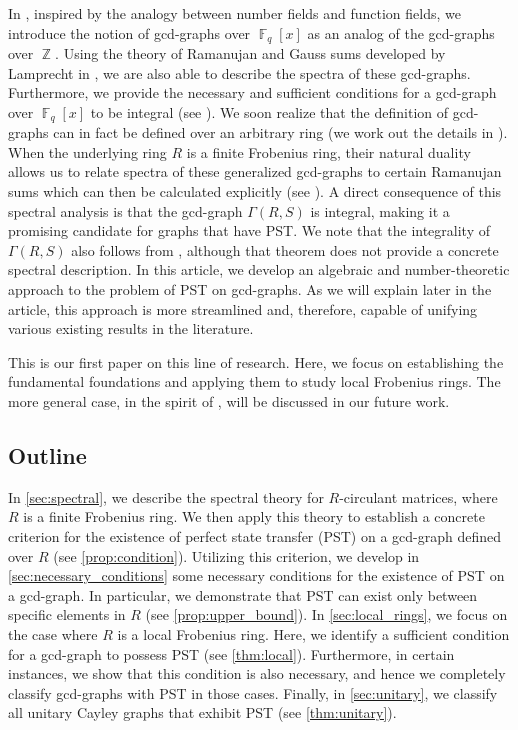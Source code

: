 \documentclass[12pt, a4paper]{amsart}
\theoremstyle{definition}
\DeclareMathOperator{\Z}{\mathbb{Z}}
\DeclareMathOperator{\F}{\mathbb{F}}
\numberwithin{equation}{section}
\begin{document}
In \cite{minavc2024gcd}, inspired by the analogy between number fields and function fields, we introduce the notion of gcd-graphs over $\F_q[x]$ as an analog of the gcd-graphs over $\Z$. Using the theory of Ramanujan and Gauss sums developed by Lamprecht in \cite{lamprecht1953allgemeine}, we are also able to describe the spectra of these gcd-graphs. Furthermore, we provide the necessary and sufficient conditions for a gcd-graph over $\F_q[x]$ to be integral (see \cite{nguyen2024integral}). We soon realize that the definition of gcd-graphs can in fact be defined over an arbitrary ring (we work out the details in \cite{nguyen2025gcd}). When the underlying ring $R$ is a finite Frobenius ring, their natural duality allows us to relate spectra of these generalized gcd-graphs to certain Ramanujan sums which can then be calculated explicitly (see \cite[Theorem 4.16]{nguyen2025gcd}). A direct consequence of this spectral analysis is that the gcd-graph $\Gamma(R,S)$ is integral, making it a promising candidate for graphs that have PST. We note that the integrality of $\Gamma(R,S)$ also follows from \cite[Theorem 1.1]{nguyen2024integral}, although that theorem does not provide a concrete spectral description. In this article, we develop an algebraic and number-theoretic approach to the problem of PST on gcd-graphs. As we will explain later in the article, this approach is more streamlined and, therefore, capable of unifying various existing results in the literature.


This is our first paper on this line of research. Here, we focus on establishing the fundamental foundations and applying them to study local Frobenius rings. The more general case, in the spirit of \cite{BP1, BP2, BP3}, will be discussed in our future work.



\subsection{Outline}
In \cref{sec:spectral}, we describe the spectral theory for $R$-circulant matrices, where $R$ is a finite Frobenius ring. We then apply this theory to establish a concrete criterion for the existence of perfect state transfer (PST) on a gcd-graph defined over $R$ (see \cref{prop:condition}). Utilizing this criterion, we develop in \cref{sec:necessary_conditions} some necessary conditions for the existence of PST on a gcd-graph. In particular, we demonstrate that PST can exist only between specific elements in $R$ (see \cref{prop:upper_bound}). In \cref{sec:local_rings}, we focus on the case where $R$ is a local Frobenius ring. Here, we identify a sufficient condition for a gcd-graph to possess PST (see \cref{thm:local}). Furthermore, in certain instances, we show that this condition is also necessary, and hence we completely classify gcd-graphs with PST in those cases. Finally, in \cref{sec:unitary}, we classify all unitary Cayley graphs that exhibit PST (see \cref{thm:unitary}). 
\end{document}
